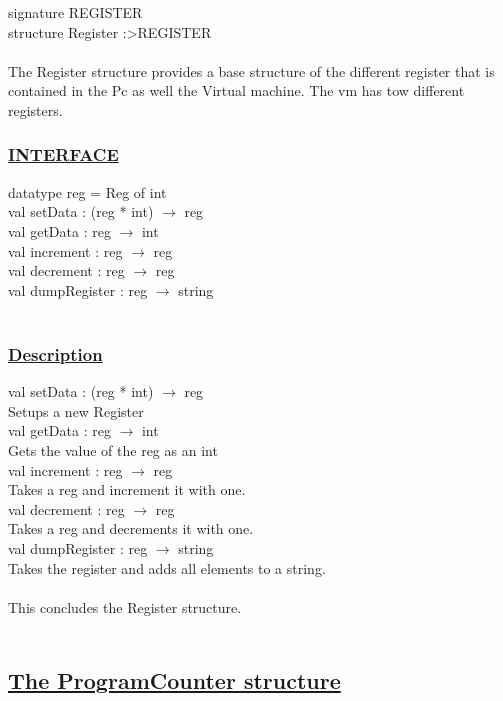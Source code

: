 \documentclass[a4paper]{article}
\begin{document}
signature REGISTER\\
structure Register :\textgreater REGISTER\\
\\
The Register structure provides a base structure of the different register that is contained in the Pc as well the Virtual machine. The vm has tow different registers.\\
\subsubsection{\uline{INTERFACE}}
	datatype reg = Reg of int 
\\	
	val setData : (reg * int) $\rightarrow$ reg 				
\\	val getData : reg $\rightarrow$ int						
\\	val increment : reg $\rightarrow$ reg						
\\	val decrement : reg $\rightarrow$ reg						
\\	val dumpRegister : reg $\rightarrow$ string
\\
\\
\subsubsection{\uline{Description}}

	val setData : (reg * int) $\rightarrow$ reg\\
		Setups a new Register \\
	val getData : reg $\rightarrow$ int	\\
		Gets the value of the reg as an int\\					
	val increment : reg $\rightarrow$ reg\\		
		Takes a reg and increment it with one.\\	
	val decrement : reg $\rightarrow$ reg\\					
		Takes a reg and decrements it with one.\\
	val dumpRegister : reg $\rightarrow$ string\\
		Takes the register and adds all elements to a string.\\
\\
This concludes the Register structure.
\\
\\
\subsection{\uline{The Program\textunderscore Counter structure}}
\end{document}
